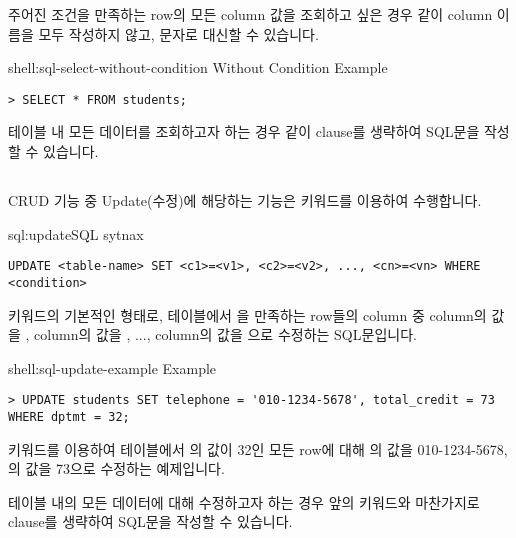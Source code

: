 주어진 조건을 만족하는 row의 모든 column 값을 조회하고 싶은 경우 \와 같이 column 이름을 모두 작성하지 않고, \cd{*} 문자로 대신할 수 있습니다.

\begin{shellenv}{shell:sql-select-without-condition}{ Without Condition Example}\begin{verbatim}
> SELECT * FROM students;
\end{verbatim}
\end{shellenv}

테이블 내 모든 데이터를 조회하고자 하는 경우 \과 같이  clause를 생략하여 SQL문을 작성할 수 있습니다.

\subsection*{}

CRUD 기능 중 Update(수정)에 해당하는 기능은  키워드를 이용하여 수행합니다.

\begin{sqlenv}{sql:update}{SQL  sytnax}\begin{verbatim}
UPDATE <table-name> SET <c1>=<v1>, <c2>=<v2>, ..., <cn>=<vn> WHERE <condition>
\end{verbatim}
\end{sqlenv}

\는  키워드의 기본적인 형태로,  테이블에서 을 만족하는 row들의 column 중  column의 값을 ,  column의 값을 , ...,  column의 값을 으로 수정하는 SQL문입니다.

\begin{shellenv}{shell:sql-update-example}{ Example}\begin{verbatim}
> UPDATE students SET telephone = '010-1234-5678', total_credit = 73 WHERE dptmt = 32;
\end{verbatim}
\end{shellenv}

\은  키워드를 이용하여  테이블에서 의 값이 32인 모든 row에 대해 의 값을 010-1234-5678, 의 값을 73으로 수정하는 예제입니다.

테이블 내의 모든 데이터에 대해 수정하고자 하는 경우 앞의  키워드와 마찬가지로  clause를 생략하여 SQL문을 작성할 수 있습니다.

